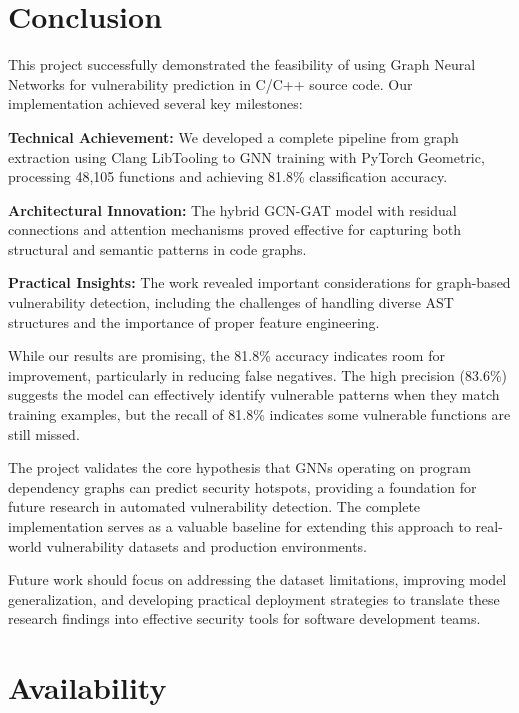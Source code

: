 \section{Conclusion}

This project successfully demonstrated the feasibility of using Graph Neural Networks for vulnerability prediction in C/C++ source code. Our implementation achieved several key milestones:

\textbf{Technical Achievement:} We developed a complete pipeline from graph extraction using Clang LibTooling to GNN training with PyTorch Geometric, processing 48,105 functions and achieving 81.8\% classification accuracy.

\textbf{Architectural Innovation:} The hybrid GCN-GAT model with residual connections and attention mechanisms proved effective for capturing both structural and semantic patterns in code graphs.

\textbf{Practical Insights:} The work revealed important considerations for graph-based vulnerability detection, including the challenges of handling diverse AST structures and the importance of proper feature engineering.

While our results are promising, the 81.8\% accuracy indicates room for improvement, particularly in reducing false negatives. The high precision (83.6\%) suggests the model can effectively identify vulnerable patterns when they match training examples, but the recall of 81.8\% indicates some vulnerable functions are still missed.

The project validates the core hypothesis that GNNs operating on program dependency graphs can predict security hotspots, providing a foundation for future research in automated vulnerability detection. The complete implementation serves as a valuable baseline for extending this approach to real-world vulnerability datasets and production environments.

Future work should focus on addressing the dataset limitations, improving model generalization, and developing practical deployment strategies to translate these research findings into effective security tools for software development teams.

\section*{Availability}

